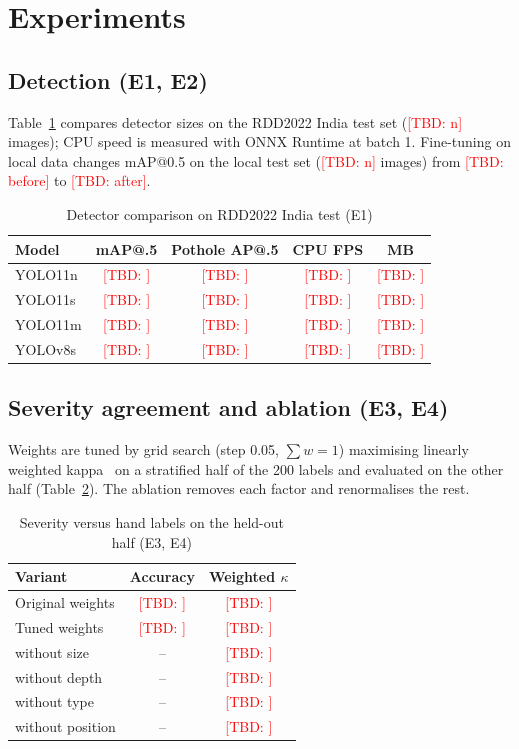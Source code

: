 \documentclass[conference]{IEEEtran}
\newcommand{\res}[1]{\textcolor{red}{[TBD: #1]}}
\begin{document}
\section{Experiments}
\subsection{Detection (E1, E2)}
Table~\ref{tab:e1} compares detector sizes on the RDD2022 India test set (\res{n} images); CPU speed
is measured with ONNX Runtime at batch 1. Fine-tuning on local data changes mAP@0.5 on the local test
set (\res{n} images) from \res{before} to \res{after}.

\begin{table}[t]
\caption{Detector comparison on RDD2022 India test (E1)}
\label{tab:e1}
\centering
\begin{tabular}{lcccc}
\toprule
Model & mAP@.5 & Pothole AP@.5 & CPU FPS & MB \\
\midrule
YOLO11n & \res{} & \res{} & \res{} & \res{} \\
YOLO11s & \res{} & \res{} & \res{} & \res{} \\
YOLO11m & \res{} & \res{} & \res{} & \res{} \\
YOLOv8s & \res{} & \res{} & \res{} & \res{} \\
\bottomrule
\end{tabular}
\end{table}

\subsection{Severity agreement and ablation (E3, E4)}
Weights are tuned by grid search (step 0.05, $\sum w=1$) maximising linearly weighted
kappa~\cite{cohen1968kappa} on a stratified half of the 200 labels and evaluated on the other half
(Table~\ref{tab:e3}). The ablation removes each factor and renormalises the rest.

\begin{table}[t]
\caption{Severity versus hand labels on the held-out half (E3, E4)}
\label{tab:e3}
\centering
\begin{tabular}{lcc}
\toprule
Variant & Accuracy & Weighted $\kappa$ \\
\midrule
Original weights & \res{} & \res{} \\
Tuned weights & \res{} & \res{} \\
\midrule
without size & -- & \res{} \\
without depth & -- & \res{} \\
without type & -- & \res{} \\
without position & -- & \res{} \\
\bottomrule
\end{tabular}
\end{table}
\end{document}
